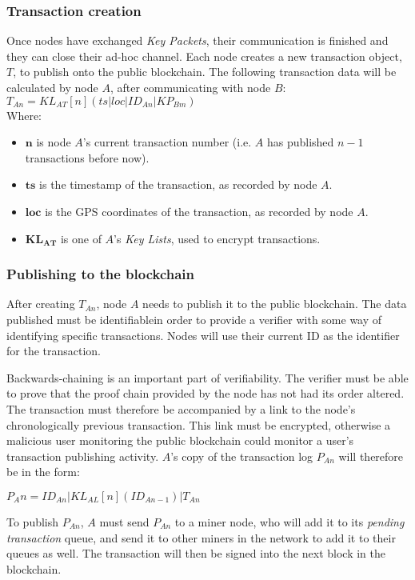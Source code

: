 \documentclass[12pt]{article}
\begin{document}
\subsubsection{Transaction creation}
Once nodes have exchanged \textit{Key Packets}, their communication is finished and they can close their ad-hoc channel. Each node creates a new transaction object, $T$, to publish onto the public blockchain. The following transaction data will be calculated by node $A$, after communicating with node $B$:
\\

$T_{An} = KL_{AT}[n](ts|loc|ID_{An}|KP_{Bm})$
\\

Where:
\begin{itemize}[noitemsep,topsep=0pt]
	\item[] $\mathbf{n}$ is node $A$'s current transaction number (i.e. $A$ has published $n-1$ transactions before now).
	\item[] $\mathbf{ts}$ is the timestamp of the transaction, as recorded by node $A$.
	\item[] $\mathbf{loc}$ is the GPS coordinates of the transaction, as recorded by node $A$.
	\item[] $\mathbf{KL_{AT}}$ is one of $A$'s \textit{Key Lists}, used to encrypt transactions.
\end{itemize}

\subsubsection{Publishing to the blockchain}
After creating $T_{An}$, node $A$ needs to publish it to the public blockchain. The data published must be identifiablein order to provide a verifier with some way of identifying specific transactions. Nodes will use their current ID as the identifier for the transaction.

Backwards-chaining is an important part of verifiability. The verifier must be able to prove that the proof chain provided by the node has not had its order altered. The transaction must therefore be accompanied by a link to the node's chronologically previous transaction. This link must be encrypted, otherwise a malicious user monitoring the public blockchain could monitor a user's transaction publishing activity. $A$'s copy of the transaction log $P_{An}$ will therefore be in the form:

$P_An = ID_{An}|KL_{AL}[n](ID_{An-1})|T_{An}$

To publish $P_{An}$, $A$ must send $P_{An}$ to a miner node, who will add it to its \textit{pending transaction} queue, and send it to other miners in the network to add it to their queues as well. The transaction will then be signed into the next block in the blockchain.
\end{document}
